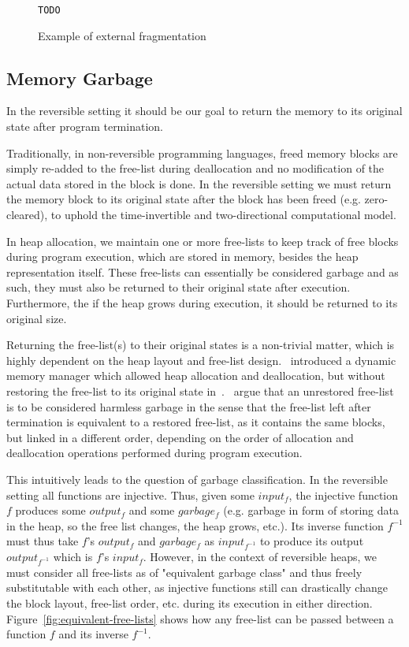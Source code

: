 \begin{figure}[ht]
\centering
\texttt{TODO}
\caption{Example of external fragmentation}
\label{fig:external-frag-example}
\end{figure}


\subsection{Memory Garbage}
\label{subsec-memory-garbage}
In the reversible setting it should be our goal to return the memory to its original state after program termination.

Traditionally, in non-reversible programming languages, freed memory blocks are simply re-added to the free-list during deallocation and no modification of the actual data stored in the block is done. In the reversible setting we must return the memory block to its original state after the block has been freed (e.g. zero-cleared), to uphold the time-invertible and two-directional computational model. 

In heap allocation, we maintain one or more free-lists to keep track of free blocks during program execution, which are stored in memory, besides the heap representation itself. These free-lists can essentially be considered garbage and as such, they must also be returned to their original state after execution. Furthermore, the if the heap grows during execution, it should be returned to its original size.

Returning the free-list(s) to their original states is a non-trivial matter, which is highly dependent on the heap layout and free-list design.~\citeauthor{ha:heap} introduced a dynamic memory manager which allowed heap allocation and deallocation, but without restoring the free-list to its original state in~\cite{ha:heap}.~\citeauthor{ha:heap} argue that an unrestored free-list is to be considered harmless garbage in the sense that the free-list left after termination is equivalent to a restored free-list, as it contains the same blocks, but linked in a different order, depending on the order of allocation and deallocation operations performed during program execution.

This intuitively leads to the question of garbage classification. In the reversible setting all functions are injective. Thus, given some $input_f$, the injective function $f$ produces some $output_f$ and some $garbage_f$ (e.g. garbage in form of storing data in the heap, so the free list changes, the heap grows, etc.). Its inverse function $f^{-1}$ must thus take $f$'s $output_f$ and $garbage_f$ as $input_{f^{-1}}$ to produce its output $output_{f^{-1}}$ which is $f$'s $input_f$. However, in the context of reversible heaps, we must consider all free-lists as of "equivalent garbage class" and thus freely substitutable with each other, as injective functions still can drastically change the block layout, free-list order, etc. during its execution in either direction. Figure~\ref{fig:equivalent-free-lists} shows how any free-list can be passed between a function $f$ and its inverse $f^{-1}$.

